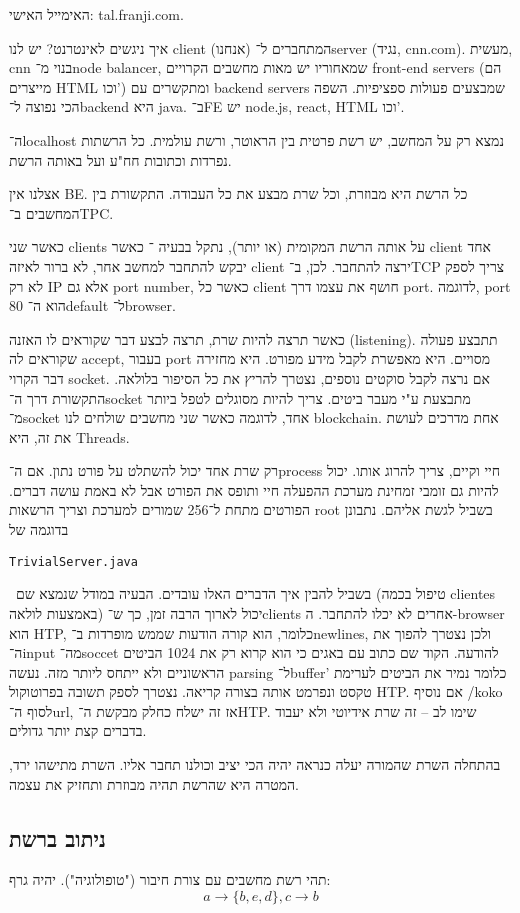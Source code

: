 \documentclass[]{article}
\newcommand\en[1] {\begin{otherlanguage}{english}#1\end{otherlanguage}}
\newcommand\ttt[1]{\en{\footnotesize\texttt{#1}\normalsize}}
\begin{document}
	האימייל האישי: tal.franji\@gmail.com. 
	
	איך ניגשים לאינטרנט? יש לנו client (אנחנו) המתחברים ל־server (נגיד, cnn.com). מעשית, cnn בנוי מ־node balancer, שמאחוריו יש מאות מחשבים הקרויים front-end servers (הם מייצרים HTML וכו') ומתקשרים עם backend servers שמבצעים פעולות ספציפיות. השפה הכי נפוצה ל־backend היא java. ב־FE יש node.js, react, HTML וכו'. 
	
	ה־localhost נמצא רק על המחשב, יש רשת פרטית בין הראוטר, ורשת עולמית. כל הרשתות נפרדות וכתובות חח"ע ועל באותה הרשת. 
	
	אצלנו אין BE. כל הרשת היא מבוזרת, וכל שרת מבצע את כל העבודה. התקשורת בין המחשבים ב־TPC. 
	
	כאשר שני clients על אותה הרשת המקומית (או יותר), נתקל בבעיה ־ כאשר client אחד יבקש להתחבר למחשב אחר, לא ברור לאיזה client ירצה להתחבר. לכן, ב־TCP צריך לספק לא רק IP אלא גם port number, כאשר כל client חושף את עצמו דרך port. לדוגמה, port 80 הוא ה־default ל־browser. 
	
	כאשר תרצה להיות שרת, תרצה לבצע דבר שקוראים לו האזנה (listening). תתבצע פעולה שקוראים לה accept, בעבור port מסויים. היא מאפשרת לקבל מידע מפורט. היא מחזירה דבר הקרוי socket. אם נרצה לקבל סוקטים נוספים, נצטרך להריץ את כל הסיפור בלולאה. התקשורת דרך ה־socket מתבצעת ע"י מעבר ביטים. צריך להיות מסוגלים לטפל ביותר מ־socket אחד, לדוגמה כאשר שני מחשבים שולחים לנו blockchain. אחת מדרכים לעושת את זה, היא Threads. 
	
	רק שרת אחד יכול להשתלט על פורט נתון. אם ה־process חיי וקיים, צריך להרוג אותו. יכול להיות גם זומבי זמחינת מערכת ההפעלה חיי ותופס את הפורט אבל לא באמת עושה דברים. 
	הפורטים מתחת ל־256 שמורים למערכת וצריך הרשאות root בשביל לגשת אליהם. נתבונן בדוגמה של \ttt{TrivialServer.java} \ בשביל להבין איך הדברים האלו עובדים. הבעיה במודל שנמצא שם (טיפול בכמה clientes באמצעות לולאה) יכול לארוך הרבה זמן, כך ש־clients אחרים לא יכלו להתחבר. ה-browser הוא HTP, כלומר, הוא קורה הודעות שממש מופרדות ב־newlines, ולכן נצטרך להפוך את ה־input מה־soccet להודעה. הקוד שם כתוב עם באגים כי הוא קרוא רק את 1024 הביטים הראשוניים ולא ייתחס ליותר מזה. נעשה parsing ל־buffer' כלומר נמיר את הביטים לערימת טקסט ונפרמט אותה בצורה קריאה. נצטרך לספק תשובה בפרוטוקול HTP. אם נוסיף /koko לסוף ה־url, אז זה ישלח כחלק מבקשת ה־HTP. שימו לב – זה שרת אידיוטי ולא יעבוד בדברים קצת יותר גדולים. 
	
	בהתחלה השרת שהמורה יעלה כנראה יהיה הכי יציב וכולנו תחבר אליו. השרת מתישהו ירד, המטרה היא שהרשת תהיה מבוזרת ותחזיק את עצמה. 
	
	\subsection{ניתוב ברשת}
	תהי רשת מחשבים עם צורת חיבור ("טופולוגיה"). יהיה גרף: 
	\[ a \to \{b, e, d\}, {c \to b} \]
	
\end{document}
